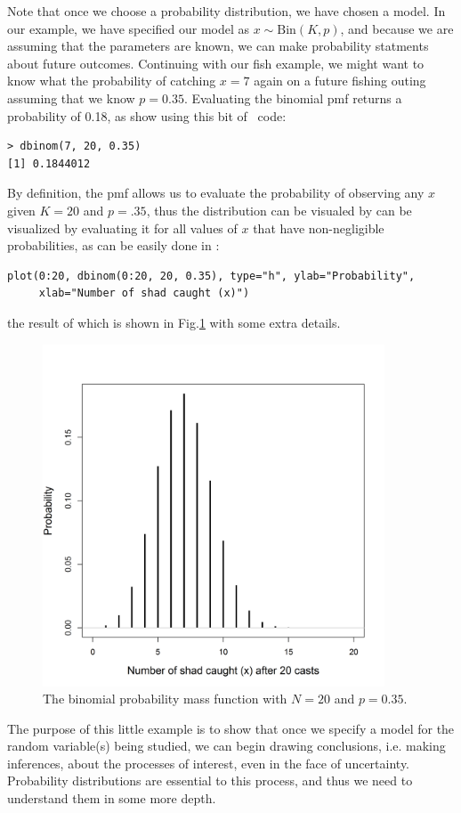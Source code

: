 Note that once we choose a probability distribution, we have chosen a
model. In our example, we have specified our model as $x \sim
\text{Bin}(K,p)$, and because we are assuming that the parameters are
known, we can make probability statments about future
outcomes. Continuing with our fish example, we might want to know what
the probability of catching $x=7$ again on a future fishing outing
assuming that we know $p=0.35$. Evaluating the binomial pmf returns a
probability of 0.18, as show using this bit of \R~code:
\begin{verbatim}
> dbinom(7, 20, 0.35)
[1] 0.1844012
\end{verbatim}
By definition, the pmf allows us to evaluate the probability of observing
any $x$ given $K=20$ and $p=.35$, thus the distribution can be visualed
by can be visualized by evaluating it for all values of $x$ that have
non-negligible probabilities, as can be easily done in \R:
\begin{verbatim}
plot(0:20, dbinom(0:20, 20, 0.35), type="h", ylab="Probability",
     xlab="Number of shad caught (x)")
\end{verbatim}
the result of which is shown in Fig.\ref{modeling.fig.bin} with some extra details.
\begin{figure}[ht!]
  \centering
  \includegraphics[width=4in,height=4in]{Ch1b/figs/bin}
\caption{The binomial probability mass function with $N=20$ and
  $p=0.35$. }
\label{modeling.fig.bin}
\end{figure}

The purpose of this little example is to show that once we specify a
model for the random variable(s) being studied, we can begin drawing
conclusions, i.e. making inferences, about the processes of interest,
even in the face of uncertainty.
Probability distributions are
essential to this process, and thus we need to
understand them in some more depth.


